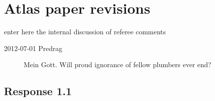 
\section{Atlas paper revisions}
\label{sect:atlasRev}

{\color{red} enter here the internal discussion of referee comments}

\begin{description}

\item[2012-07-01 Predrag] Mein Gott. Will proud ignorance of fellow
plumbers ever end?

\end{description}

\subsection{Response 1.1}
\label{sect:Response1.1}

